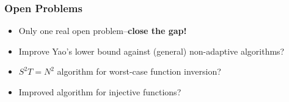 \documentclass[usenames, dvipsnames, t, table]{beamer}
\begin{document}



      \begin{frame}
        \frametitle{Open Problems}
        \begin{itemize}
        \item Only one real open problem--\pause\textbf{close the gap!}
          \pause
        \item Improve Yao's lower bound against (general) non-adaptive algorithms?
          \pause
        \item $S^2 T = N^2$ algorithm for worst-case function inversion?
          \pause
        \item Improved algorithm for injective functions?
        \end{itemize}
      \end{frame}
\end{document}
